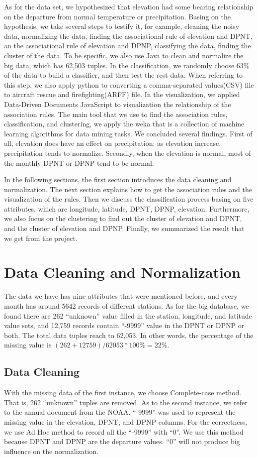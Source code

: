\documentclass[11pt]{article}
\begin{document}
As for the data set, we hypothesized that elevation had some bearing relationship on the departure from normal temperature or precipitation. Basing on the hypothesis, we take several steps to testify it, for example, cleaning the noisy data, normalizing the data, finding the associational rule of elevation and DPNT, an the associational rule of elevation and DPNP, classifying the data, finding the cluster of the data. To be specific, we also use Java to clean and normalize the big data, which has 62,503 tuples. In the classification, we randomly choose 63\% of the data to build a classifier, and then test the rest data. When referring to this step, we also apply python to converting a comma-separated values(CSV) file to aircraft rescue and firefighting(ARFF) file. In the visualization, we applied Data-Driven Documents JavaScript to visualization the relationship of the association rules. The main tool that we use to find the association rules, classification, and clustering, we apply the weka that is a collection of machine learning algorithms for data mining tasks\cite{hall2009weka}. We concluded several findings. First of all, elevation does have an effect on precipitation: as elevation increase, precipitation tends to normalize. Secondly, when the elevation is normal, most of the monthly DPNT or DPNP tend to be normal.

In the following sections, the first section introduces the data cleaning and normalization. The next section explains how to get the association rules and the visualization of the rules. Then we discuss the classification process basing on five attributes, which are longitude, latitude, DPNT, DPNP, elevation. Furthermore, we also fucus on the clustering to find out the cluster of elevation and DPNT, and the cluster of elevation and DPNP. Finally, we summarized the result that we get from the project.


\section{Data Cleaning and Normalization}
The data we have has nine attributes that were mentioned before, and every month has around 5642 records of different stations. As for the big database, we found there are 262 ``unknown'' value filled in the station, longitude, and latitude value sets, and 12,759 records contain ``-9999'' value in the DPNT or DPNP or both. The total data tuples reach to 62,053. In other words, the percentage of the missing value is $( 262 + 12759 ) / 62053 * 100\% = 22\% $.
\subsection{Data Cleaning}
With the missing data of the first instance, we choose Complete-case method\cite{han2006data}. That is, 262 ``unknown'' tuples are removed. As to the second instance, we refer to the annual document from the NOAA. ``-9999'' was used to represent the missing value in the elevation, DPNT, and DPNP columns. For the correctness, we use Ad Hoc method to record all the ``-9999'' with ``0''. We use this method because DPNT and DPNP are the departure values. ``0'' will not produce big influence on the normalization.
\end{document}

